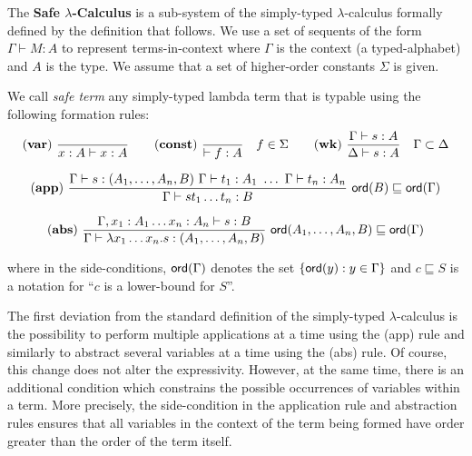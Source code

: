 \documentclass{llncs}
\newcommand\dps{\displaystyle}
\newcommand\rulef[2]{\frac{\dps #1}{#2}}
\newcommand\ord[1]{{\sf ord}(#1)}
\newcommand{\rulename}[1]{\mathbf{(#1)}}
\begin{document}
The \textbf{Safe $\lambda$-Calculus} is a sub-system of the simply-typed $\lambda$-calculus formally defined by the definition that follows.
We use a set of sequents of the form $\Gamma \vdash M : A$ to represent
terms-in-context where $\Gamma$ is the context (a typed-alphabet) and $A$ is the type. We assume that a set
of higher-order constants $\Sigma$ is given.

\begin{definition}
We call \emph{safe term} any simply-typed lambda term that is typable using the following
formation rules:
$$ \rulename{var} \   \rulef{}{x : A\vdash x : A}
\qquad  \rulename{const} \   \rulef{}{\vdash f : A} \quad f \in \Sigma
\qquad  \rulename{wk} \   \rulef{\Gamma \vdash s : A}{\Delta \vdash s : A} \quad \Gamma \subset \Delta$$

$$ \rulename{app} \  \rulef{\Gamma \vdash s : (A_1,\ldots,A_n,B)
                                        \ \Gamma \vdash t_1 : A_1
                                        \  \ldots\  \Gamma \vdash t_n : A_n }
                                   {\Gamma  \vdash s t_1 \ldots t_n : B}
                                    \
                                   \ord{B} \sqsubseteq \ord{\Gamma}$$

$$ \rulename{abs} \   \rulef{\Gamma, x_1 : A_1 \ldots x_n : A_n \vdash s : B}
                                   {\Gamma  \vdash \lambda x_1 \ldots x_n . s : (A_1, \ldots ,A_n,B)} \
                                   \ord{A_1, \ldots ,A_n,B} \sqsubseteq \ord{\Gamma}$$

where in the side-conditions, $\ord{\Gamma}$ denotes the set $\{ \ord{y} : y \in \Gamma \}$ and $c \sqsubseteq S$ is a notation for
``$c$ is a lower-bound for $S$''.
\end{definition}

The first deviation from the standard definition of the simply-typed $\lambda$-calculus is the possibility to perform multiple applications at a time using the {\sf (app)} rule and similarly to abstract several variables at a time using the {\sf (abs)} rule.
Of course, this change does not alter the expressivity. However, at the same time, there is an additional condition
which constrains the possible occurrences of variables within a term. More precisely, the side-condition in the application rule and abstraction rules ensures that all variables in the context of the term being formed have order greater than the order of the term itself.
\end{document}
